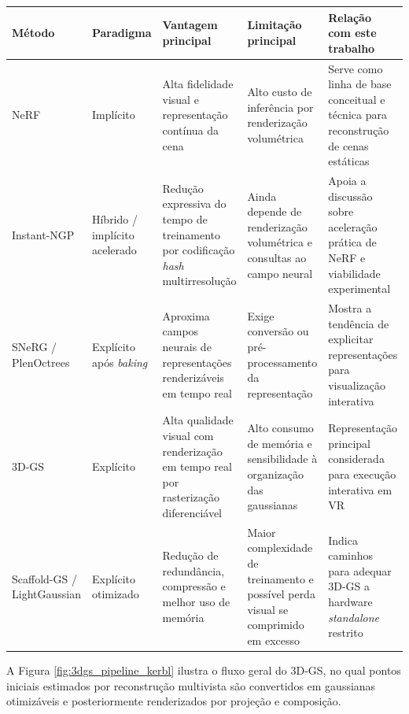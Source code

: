 \begin{quadro}[H]
\centering
\footnotesize
\caption{Comparação entre métodos relevantes para síntese de novas vistas e execução interativa.}
\label{qua:comparacao_metodos_3dgs}
\renewcommand{\arraystretch}{1.2}
\setlength{\tabcolsep}{3pt}
\begin{tabularx}{\textwidth}{|p{2.2cm}|p{2.2cm}|p{3.2cm}|p{3.4cm}|X|}
\hline
\textbf{Método} & \textbf{Paradigma} & \textbf{Vantagem principal} & \textbf{Limitação principal} & \textbf{Relação com este trabalho} \\
\hline
NeRF & Implícito & Alta fidelidade visual e representação contínua da cena & Alto custo de inferência por renderização volumétrica & Serve como linha de base conceitual e técnica para reconstrução de cenas estáticas \\
\hline
Instant-NGP & Híbrido / implícito acelerado & Redução expressiva do tempo de treinamento por codificação \textit{hash} multirresolução & Ainda depende de renderização volumétrica e consultas ao campo neural & Apoia a discussão sobre aceleração prática de NeRF e viabilidade experimental \\
\hline
SNeRG / PlenOctrees & Explícito após \textit{baking} & Aproxima campos neurais de representações renderizáveis em tempo real & Exige conversão ou pré-processamento da representação & Mostra a tendência de explicitar representações para visualização interativa \\
\hline
3D-GS & Explícito & Alta qualidade visual com renderização em tempo real por rasterização diferenciável & Alto consumo de memória e sensibilidade à organização das gaussianas & Representação principal considerada para execução interativa em VR \\
\hline
Scaffold-GS / LightGaussian & Explícito otimizado & Redução de redundância, compressão e melhor uso de memória & Maior complexidade de treinamento e possível perda visual se comprimido em excesso & Indica caminhos para adequar 3D-GS a hardware \textit{standalone} restrito \\
\hline
\end{tabularx}
\end{quadro}

A Figura \ref{fig:3dgs_pipeline_kerbl} ilustra o fluxo geral do 3D-GS, no qual pontos iniciais estimados por reconstrução multivista são convertidos em gaussianas otimizáveis e posteriormente renderizados por projeção e composição.


